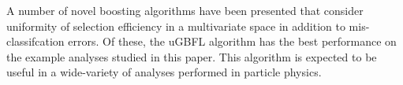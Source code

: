 A number of novel boosting algorithms have been presented that consider uniformity of selection efficiency in a multivariate space in addition to mis-classifcation errors.  Of these, the uGBFL algorithm has the best performance on the example analyses studied in this paper.
This algorithm is expected to be useful in a wide-variety of analyses performed in particle physics.
